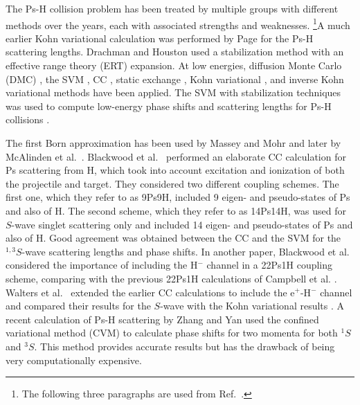 \documentclass[Dissertation.tex]{subfiles}
\begin{document}
The Ps-H collision problem has been treated by multiple groups with different
methods over the years, each with associated strengths and weaknesses.
\footnote{The following three paragraphs are used from Ref.~\cite{Woods2015}.}A much 
earlier Kohn variational calculation was performed by Page \cite{Page1976} 
for the Ps-H scattering lengths. Drachman and Houston
\cite{Drachman1975,Drachman1976} used
a stabilization method with an effective range theory (ERT) expansion.
At low energies, diffusion Monte Carlo (DMC)
\cite{Chiesa2002}, the SVM \cite{Ivanov2001,Ivanov2002}, CC
\cite{Sinha1997,Campbell1998,Adhikari1999,Sinha2000,Blackwood2002,Blackwood2002b,Walters2004},
static exchange \cite{Hara1975,Ray1996,Ray1997}, Kohn variational
\cite{Page1976,VanReeth2003,VanReeth2004}, and inverse Kohn
variational \cite{VanReeth2003,VanReeth2004} methods have been applied. The SVM
with stabilization 
techniques was used to compute low-energy phase shifts and 
scattering lengths for Ps-H collisions \cite{Ivanov2001,Ivanov2002}.

The first Born approximation has been used by Massey and Mohr \cite{Massey1954}
and later by McAlinden et al.~\cite{McAlinden1996}.
Blackwood et al.~\cite{Blackwood2002} performed an elaborate CC calculation 
for Ps scattering from H, which took into account excitation and ionization 
of both the projectile and target. They considered two different coupling 
schemes. The first one, which they refer to as 9Ps9H, included 9 eigen- and 
pseudo-states of Ps and also of H. The second scheme, which they refer to as 
14Ps14H, was used for $S$-wave singlet scattering only and included
14 eigen- and pseudo-states of 
Ps and also of H. Good agreement was obtained between the CC
\cite{Blackwood2002} and the SVM \cite{Ivanov2002} for the $^{1,3}S$-wave scattering
lengths and phase shifts. In another paper, Blackwood et
al.~\cite{Blackwood2002b} considered the importance of including the H$^-$
channel in a 22Ps1H coupling scheme, comparing with the previous 22Ps1H
calculations of Campbell et al. \cite{Campbell1998}. Walters et
al.~\cite{Walters2004} extended the earlier CC calculations
\cite{Blackwood2002} to include the e$^+$-H$^-$ channel
\cite{Blackwood2002b} and compared their results for the $S$-wave with the
Kohn variational results \cite{VanReeth2003}.
A recent calculation of Ps-H scattering by Zhang and Yan
\cite{Zhang2012} used the
confined variational method (CVM) to calculate phase shifts for two momenta
for both $^1S$ and $^3S$. This method provides accurate
results but has the drawback of being very computationally expensive.
\end{document}
